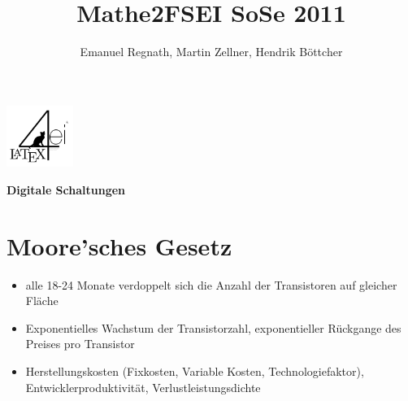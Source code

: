 \documentclass[6pt,a4paper]{scrartcl}
\title{Mathe2FSEI SoSe 2011}
\author{Emanuel Regnath, Martin Zellner, Hendrik Böttcher}
\renewcommand{\emph}[1]{\textsf{\textbf{#1}}}
\begin{document}
\begin{multicols}{3}

\parbox{2.3cm}{
	\includegraphics[height=2cm]{img/Logo.pdf}
}
\parbox{4cm}{
	\emph{\huge{Digitale Schaltungen}}
}

\section{Moore'sches Gesetz}
\begin{itemize} \itemsep0pt
	\item alle 18-24 Monate verdoppelt sich die Anzahl der Transistoren auf gleicher Fläche
	\item Exponentielles Wachstum der Transistorzahl, exponentieller Rückgange des Preises pro Transistor
	\item Herstellungskosten (Fixkosten, Variable Kosten, Technologiefaktor), Entwicklerproduktivität, Verlustleistungsdichte
\end{itemize}


\end{multicols}
\end{document}
